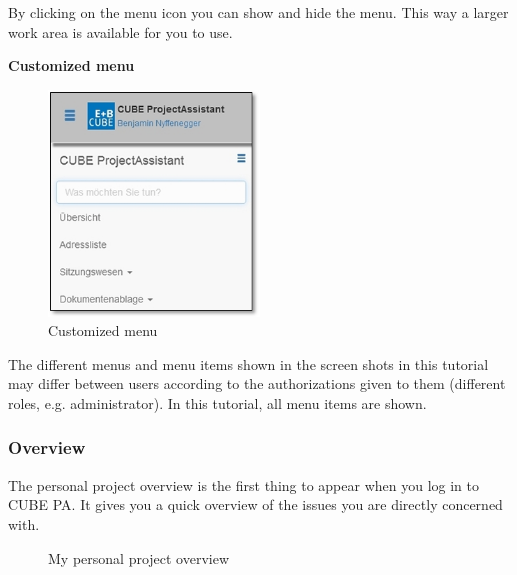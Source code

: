 By clicking on the menu icon  you can show and hide the menu. This way a larger work area is available for you to use.

\vspace{6.5cm}  

\textbf{Customized menu}

\begin{figure}
\vspace{-35pt}
\includegraphics[height=60mm]{../chapters/01_Einfuehrung/pictures/1-3-1_MenuAngepasst.jpg}
\caption{Customized menu}
\end{figure}

The different menus and menu items shown in the screen shots in this tutorial may differ between users according to the authorizations given to them (different roles, e.g. administrator). In this tutorial, all menu items are shown.

\subsubsection{Overview}
\label{bkm:Ref132000001}
The personal project overview is the first thing to appear when you log in to CUBE PA. It gives you a quick overview of the issues you are directly concerned with.

\begin{figure}[H] %
\caption{My personal project overview}
\end{figure}

